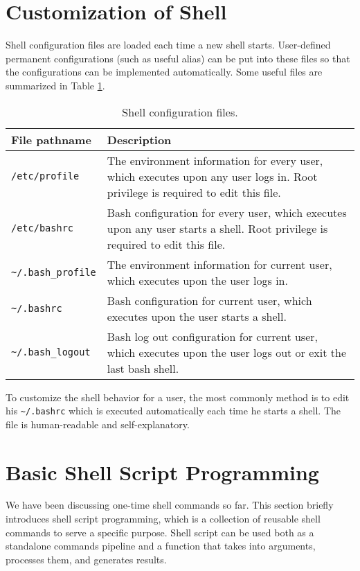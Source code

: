 \section{Customization of Shell} \label{ch:sb:subsec:customizeshell}

Shell configuration files are loaded each time a new shell starts. User-defined permanent configurations (such as useful alias) can be put into these files so that the configurations can be implemented automatically. Some useful files are summarized in Table \ref{ch:sb:tab:shellconfig}.

\begin{table}[!htb]
	\centering \caption{Shell configuration files.}\label{ch:sb:tab:shellconfig}
	\begin{tabularx}{\textwidth}{lX}
		\hline
		File pathname & Description \\ \hline
		\verb|/etc/profile| & The environment information for every user, which executes upon any user logs in. Root privilege is required to edit this file.  \\ 
		\verb|/etc/bashrc| & Bash configuration for every user, which executes upon any user starts a shell. Root privilege is required to edit this file. \\ 
		\verb|~/.bash_profile| & The environment information for current user, which executes upon the user logs in. \\ 
		\verb|~/.bashrc| & Bash configuration for current user, which executes upon the user starts a shell. \\ 
		\verb|~/.bash_logout| & Bash log out configuration for current user, which executes upon the user logs out or exit the last bash shell. \\ \hline
	\end{tabularx}
\end{table}

To customize the shell behavior for a user, the most commonly method is to edit his \verb|~/.bashrc| which is executed automatically each time he starts a shell. The file is human-readable and self-explanatory.

\section{Basic Shell Script Programming}

We have been discussing one-time shell commands so far. This section briefly introduces shell script programming, which is a collection of reusable shell commands to serve a specific purpose. Shell script can be used both as a standalone commands pipeline and a function that takes into arguments, processes them, and generates results.

